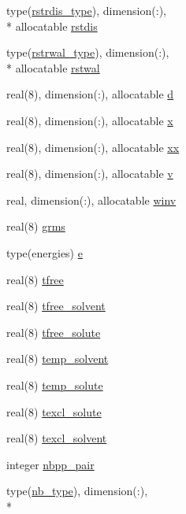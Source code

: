 \begin{DoxyCompactItemize}
\item 
type(\hyperlink{structmd_1_1rstrdis__type}{rstrdis\-\_\-type}), dimension(\-:), \\*
allocatable \hyperlink{classmd_a51772d14e966c59e1f91116fa44e1392}{rstdis}
\item 
type(\hyperlink{structmd_1_1rstrwal__type}{rstrwal\-\_\-type}), dimension(\-:), \\*
allocatable \hyperlink{classmd_a63f220f467d396d46266866a09312ee0}{rstwal}
\item 
real(8), dimension(\-:), allocatable \hyperlink{classmd_a8fe955cf1afc3e558079e3f123d5cc4e}{d}
\item 
real(8), dimension(\-:), allocatable \hyperlink{classmd_ac6fbffb623e5a2a3e444dcf6a3c99ff3}{x}
\item 
real(8), dimension(\-:), allocatable \hyperlink{classmd_a9d2b9bed926d39080b64bdf9d4192fc9}{xx}
\item 
real(8), dimension(\-:), allocatable \hyperlink{classmd_a0eb489f64d496d6a73efa40b03d7a7ac}{v}
\item 
real, dimension(\-:), allocatable \hyperlink{classmd_aa6a352396cbf609b8cbeed1a5bb5aed4}{winv}
\item 
real(8) \hyperlink{classmd_aa78ae49355795a928f821c72e943312e}{grms}
\item 
type(energies) \hyperlink{classmd_a24e4a11c732fef3d58a2b1c0db037ad2}{e}
\item 
real(8) \hyperlink{classmd_ac5ed2788ab9247d69ed64b95b6b44af5}{tfree}
\item 
real(8) \hyperlink{classmd_a80ab4ec7d5eba0069f46705237d2ba0d}{tfree\-\_\-solvent}
\item 
real(8) \hyperlink{classmd_affb05f7cd49461aeb89ae49a4fa48c1b}{tfree\-\_\-solute}
\item 
real(8) \hyperlink{classmd_afcc462c82be9deb130a281435450ec2d}{temp\-\_\-solvent}
\item 
real(8) \hyperlink{classmd_ae90b61f6150810cd40b059f4d3df6f70}{temp\-\_\-solute}
\item 
real(8) \hyperlink{classmd_a5ce715a3ebe473b75055a02001415d0f}{texcl\-\_\-solute}
\item 
real(8) \hyperlink{classmd_a4a0dd664ab2993af3ece7e8f0e3811d7}{texcl\-\_\-solvent}
\item 
integer \hyperlink{classmd_a4dfac27b4d89f55bc63053cad0861dba}{nbpp\-\_\-pair}
\item 
type(\hyperlink{structmd_1_1nb__type}{nb\-\_\-type}), dimension(\-:), \\*

\end{DoxyCompactItemize}
